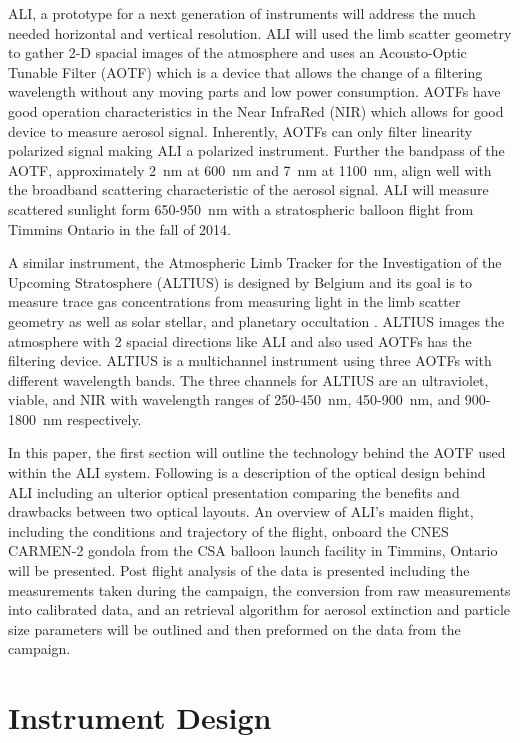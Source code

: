 \documentclass[12pt]{article}
\begin{document}
ALI, a prototype for a next generation of instruments will address the much needed horizontal and vertical resolution. ALI will used the limb scatter geometry to gather 2-D spacial images of the atmosphere and uses an Acousto-Optic Tunable Filter (AOTF) which is a device that allows the change of a filtering wavelength without any moving parts and low power consumption. AOTFs have good operation characteristics in the Near InfraRed (NIR) which allows for good device to measure aerosol signal. Inherently, AOTFs can only filter linearity polarized signal making ALI a polarized instrument. Further the bandpass of the AOTF, approximately 2~nm at 600~nm and 7~nm at 1100~nm, align well with the broadband scattering characteristic of the aerosol signal. ALI will measure scattered sunlight form 650-950~nm with a stratospheric balloon flight from Timmins Ontario in the fall of 2014.

A similar instrument, the Atmospheric Limb Tracker for the Investigation of the Upcoming Stratosphere (ALTIUS) is designed by Belgium and its goal is to measure trace gas concentrations from measuring light in the limb scatter geometry as well as solar stellar, and planetary occultation \citep{Dekemper2012}. ALTIUS images the atmosphere with 2 spacial directions like ALI and also used AOTFs has the filtering device. ALTIUS is a multichannel instrument using three AOTFs with different wavelength bands. The three channels for ALTIUS are an ultraviolet, viable, and NIR with wavelength ranges of 250-450~nm, 450-900~nm, and 900-1800~nm respectively.

In this paper, the first section will outline the technology behind the AOTF used within the ALI system. Following is a description of the optical design behind ALI including an ulterior optical presentation comparing the benefits and drawbacks between two optical layouts. An overview of ALI's maiden flight, including the conditions and trajectory of the flight, onboard the CNES CARMEN-2 gondola from the CSA balloon launch facility in Timmins, Ontario will be presented. Post flight analysis of the data is presented including the measurements taken during the campaign, the conversion from raw measurements into calibrated data, and an retrieval algorithm for aerosol extinction and particle size parameters will be outlined and then preformed on the data from the campaign.

\section{Instrument Design}
\end{document}
